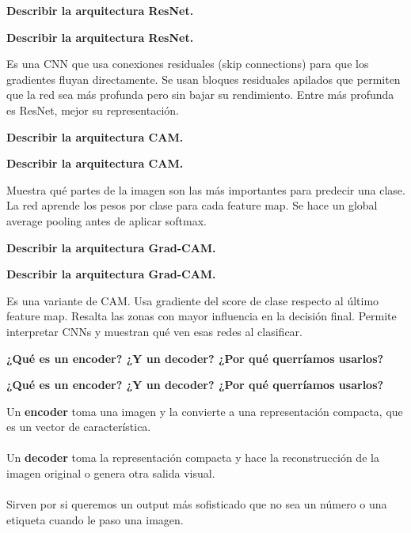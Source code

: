 \documentclass[10pt]{memoir}
\begin{document}
\clearpage
\begin{center}
	\textbf{\Large Describir la arquitectura ResNet.}
\end{center}

\clearpage
\begin{center}
	\textbf{\Large Describir la arquitectura ResNet.}
\end{center}
\noindent Es una CNN que usa conexiones residuales (skip connections) para que los gradientes fluyan directamente. Se usan bloques residuales apilados que permiten que la red sea más profunda pero sin bajar su rendimiento. Entre más profunda es ResNet, mejor su representación.

\clearpage
\begin{center}
	\textbf{\Large Describir la arquitectura CAM.}
\end{center}

\clearpage
\begin{center}
	\textbf{\Large Describir la arquitectura CAM.}
\end{center}
\noindent Muestra qué partes de la imagen son las más importantes para predecir una clase. La red aprende los pesos por clase para cada feature map. Se hace un global average pooling antes de aplicar softmax.

\clearpage
\begin{center}
	\textbf{\Large Describir la arquitectura Grad-CAM.}
\end{center}

\clearpage
\begin{center}
	\textbf{\Large Describir la arquitectura Grad-CAM.}
\end{center}
\noindent Es una variante de CAM. Usa gradiente del score de clase respecto al último feature map. Resalta las zonas con mayor influencia en la decisión final. Permite interpretar CNNs y muestran qué ven esas redes al clasificar.


\clearpage
\begin{center}
	\textbf{\Large ¿Qué es un encoder? ¿Y un decoder? ¿Por qué querríamos usarlos?}
\end{center}

\clearpage
\begin{center}
	\textbf{\Large ¿Qué es un encoder? ¿Y un decoder? ¿Por qué querríamos usarlos?}
\end{center}
\noindent Un \textbf{encoder} toma una imagen y la convierte a una representación compacta, que es un vector de característica. \\
\\
\noindent Un \textbf{decoder} toma la representación compacta y hace la reconstrucción de la imagen original o genera otra salida visual. \\
\\
\noindent Sirven por si queremos un output más sofisticado que no sea un número o una etiqueta cuando le paso una imagen.
\end{document}
